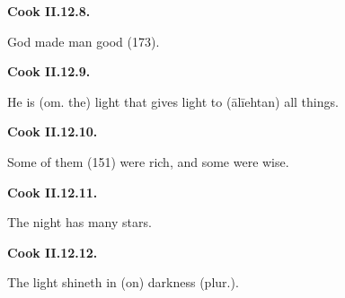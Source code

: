\par\begin{minipage}{\linewidth}\raggedright
\textbf{Cook II.12.8.}

God made man good (173).

\end{minipage}\par\addvspace{4pt}

\par\begin{minipage}{\linewidth}\raggedright
\textbf{Cook II.12.9.}

He is (om. the) light that gives light to (ālīehtan) all things.

\end{minipage}\par\addvspace{4pt}

\par\begin{minipage}{\linewidth}\raggedright
\textbf{Cook II.12.10.}

Some of them (151) were rich, and some were wise.

\end{minipage}\par\addvspace{4pt}

\par\begin{minipage}{\linewidth}\raggedright
\textbf{Cook II.12.11.}

The night has many stars.

\end{minipage}\par\addvspace{4pt}

\par\begin{minipage}{\linewidth}\raggedright
\textbf{Cook II.12.12.}

The light shineth in (on) darkness (plur.).

\end{minipage}\par\addvspace{4pt}

